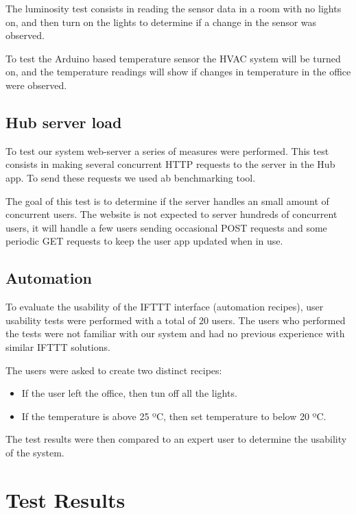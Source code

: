 The luminosity test consists in reading the sensor data in a room with no lights on, and then turn on the lights to determine if a change in the sensor was observed.

To test the Arduino based temperature sensor the \ac{HVAC} system will be turned on, and the temperature readings will show if changes in temperature in the office were observed.


\subsection{Hub server load}


To test our system web-server a series of measures were performed. This test consists in making several concurrent \ac{HTTP} requests to the server in the Hub app. To send these requests we used \ac{ab} benchmarking tool.

The goal of this test is to determine if the server handles an small amount of concurrent users. The website is not expected to server hundreds of concurrent users, it will handle a few users sending occasional POST requests and some periodic GET requests to keep the user app updated when in use.


\subsection{Automation}

To evaluate the usability of the \ac{IFTTT} interface (automation recipes), user usability tests were performed with a total of 20 users. The users who performed the tests were not familiar with our system and had no previous experience with similar \ac{IFTTT} solutions.

The users were asked to create two distinct recipes:

\begin{itemize}
  \item If the user left the office, then tun off all the lights.
  \item If the temperature is above 25 ºC, then set temperature to below 20 ºC. 
\end{itemize} 

The test results were then compared to an expert user to determine the usability of the system.



\section{Test Results}


